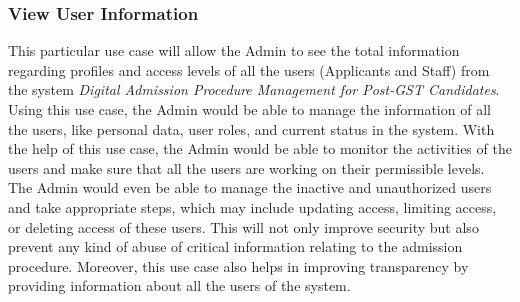 \subsubsection{View User Information}

This particular use case will allow the Admin to see the total information regarding profiles and access levels of all the users (Applicants and Staff) from the system \textit{Digital Admission Procedure Management for Post-GST Candidates}. Using this use case, the Admin would be able to manage the information of all the users, like personal data, user roles, and current status in the system. With the help of this use case, the Admin would be able to monitor the activities of the users and make sure that all the users are working on their permissible levels. The Admin would even be able to manage the inactive and unauthorized users and take appropriate steps, which may include updating access, limiting access, or deleting access of these users. This will not only improve security but also prevent any kind of abuse of critical information relating to the admission procedure. Moreover, this use case also helps in improving transparency by providing information about all the users of the system.

